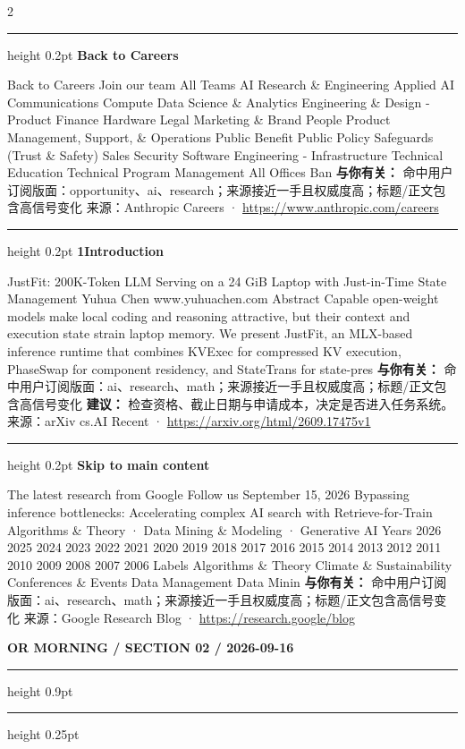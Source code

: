 \documentclass[10.5pt]{ctexart}
\begin{document}
\begin{multicols}{2}
\vspace{2mm}
\hrule height 0.2pt
\vspace{2mm}
{\large\bfseries Back to Careers}\par
Back to Careers Join our team All Teams AI Research \& Engineering Applied AI Communications Compute Data Science \& Analytics Engineering \& Design - Product Finance Hardware Legal Marketing \& Brand People Product Management, Support, \& Operations Public Benefit Public Policy Safeguards (Trust \& Safety) Sales Security Software Engineering - Infrastructure Technical Education Technical Program Management All Offices Ban
\textbf{与你有关：} 命中用户订阅版面：opportunity、ai、research；来源接近一手且权威度高；标题/正文包含高信号变化
{\footnotesize\color{ormuted} 来源：Anthropic Careers · \url{https://www.anthropic.com/careers}}
\vspace{2mm}
\hrule height 0.2pt
\vspace{2mm}
{\large\bfseries 1Introduction}\par
JustFit: 200K-Token LLM Serving on a 24 GiB Laptop with Just-in-Time State Management Yuhua Chen www.yuhuachen.com Abstract Capable open-weight models make local coding and reasoning attractive, but their context and execution state strain laptop memory. We present JustFit, an MLX-based inference runtime that combines KVExec for compressed KV execution, PhaseSwap for component residency, and StateTrans for state-pres
\textbf{与你有关：} 命中用户订阅版面：ai、research、math；来源接近一手且权威度高；标题/正文包含高信号变化
\textbf{建议：} 检查资格、截止日期与申请成本，决定是否进入任务系统。
{\footnotesize\color{ormuted} 来源：arXiv cs.AI Recent · \url{https://arxiv.org/html/2609.17475v1}}
\vspace{2mm}
\hrule height 0.2pt
\vspace{2mm}
{\large\bfseries Skip to main content}\par
The latest research from Google Follow us September 15, 2026 Bypassing inference bottlenecks: Accelerating complex AI search with Retrieve-for-Train Algorithms \& Theory · Data Mining \& Modeling · Generative AI Years 2026 2025 2024 2023 2022 2021 2020 2019 2018 2017 2016 2015 2014 2013 2012 2011 2010 2009 2008 2007 2006 Labels Algorithms \& Theory Climate \& Sustainability Conferences \& Events Data Management Data Minin
\textbf{与你有关：} 命中用户订阅版面：ai、research、math；来源接近一手且权威度高；标题/正文包含高信号变化
{\footnotesize\color{ormuted} 来源：Google Research Blog · \url{https://research.google/blog}}
\end{multicols}
\newpage
{\small\bfseries OR MORNING / SECTION 02 / 2026-09-16}
\vspace{2mm}
\hrule height 0.9pt
\vspace{1.5mm}
\hrule height 0.25pt
\vspace{4mm}
\end{document}
